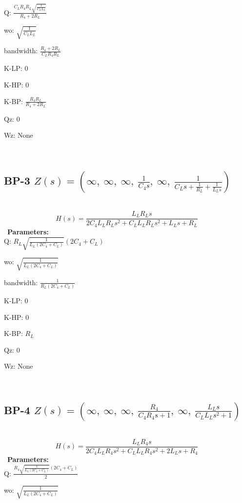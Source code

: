 \documentclass{article}
\begin{document}
Q: $\frac{C_{L} R_{4} R_{L} \sqrt{\frac{1}{C_{L} L_{L}}}}{R_{4} + 2 R_{L}}$\ 

wo: $\sqrt{\frac{1}{C_{L} L_{L}}}$\ 

bandwidth: $\frac{R_{4} + 2 R_{L}}{C_{L} R_{4} R_{L}}$\ 

K-LP: $0$\ 

K-HP: $0$\ 

K-BP: $\frac{R_{4} R_{L}}{R_{4} + 2 R_{L}}$\ 

Qz: $0$\ 

Wz: $\text{None}$\ 

\ 

\subsection{BP-3 $Z(s) = \left( \infty, \  \infty, \  \infty, \  \frac{1}{C_{4} s}, \  \infty, \  \frac{1}{C_{L} s + \frac{1}{R_{L}} + \frac{1}{L_{L} s}}\right)$ } \ 
\textbf{\[H(s) = \frac{L_{L} R_{L} s}{2 C_{4} L_{L} R_{L} s^{2} + C_{L} L_{L} R_{L} s^{2} + L_{L} s + R_{L}}\] } \ 
\textbf{Parameters:}\\ 

Q: $R_{L} \sqrt{\frac{1}{L_{L} \left(2 C_{4} + C_{L}\right)}} \left(2 C_{4} + C_{L}\right)$\ 

wo: $\sqrt{\frac{1}{L_{L} \left(2 C_{4} + C_{L}\right)}}$\ 

bandwidth: $\frac{1}{R_{L} \left(2 C_{4} + C_{L}\right)}$\ 

K-LP: $0$\ 

K-HP: $0$\ 

K-BP: $R_{L}$\ 

Qz: $0$\ 

Wz: $\text{None}$\ 

\ 

\subsection{BP-4 $Z(s) = \left( \infty, \  \infty, \  \infty, \  \frac{R_{4}}{C_{4} R_{4} s + 1}, \  \infty, \  \frac{L_{L} s}{C_{L} L_{L} s^{2} + 1}\right)$ } \ 
\textbf{\[H(s) = \frac{L_{L} R_{4} s}{2 C_{4} L_{L} R_{4} s^{2} + C_{L} L_{L} R_{4} s^{2} + 2 L_{L} s + R_{4}}\] } \ 
\textbf{Parameters:}\\ 

Q: $\frac{R_{4} \sqrt{\frac{1}{L_{L} \left(2 C_{4} + C_{L}\right)}} \left(2 C_{4} + C_{L}\right)}{2}$\ 

wo: $\sqrt{\frac{1}{L_{L} \left(2 C_{4} + C_{L}\right)}}$\ 
\end{document}
